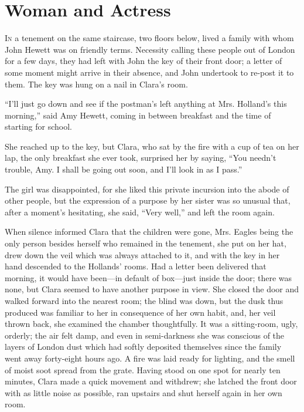 \chapter{Woman and Actress}

\textsc{In} a tenement on the same staircase, two floors below, lived a
family with whom John Hewett was on friendly terms. Necessity calling
these people out of London for a few days, they had left with John the
key of their front door; a letter of some moment might arrive in their
absence, and John undertook to re-post it to them. The key was hung on a
nail in Clara's room.

``I'll just go down and see if the postman's left anything at Mrs.
Holland's this morning,'' said Amy Hewett, coming in between breakfast
and the time of starting for school.

She reached up to the key, but Clara, who sat by the fire with a cup of
tea on her lap, the only breakfast she ever took, surprised her by
saying, ``You needn't trouble, Amy. I shall be going out soon, and I'll
look in as I pass.''

{}The girl was disappointed, for she liked this private incursion into
the abode of other people, but the expression of a purpose by her sister
was so unusual that, after a moment's hesitating, she said, ``Very
well,'' and left the room again.

When silence informed Clara that the children were gone, Mrs. Eagles
being the only person besides herself who remained in the tenement, she
put on her hat, drew down the veil which was always attached to it, and
with the key in her hand descended to the Hollands' rooms. Had a letter
been delivered that morning, it would have been---in default of
box---just inside the door; there was none, but Clara seemed to have
another purpose in view. She closed the door and walked forward into the
nearest room; the blind was down, but the dusk thus produced was
familiar to her in consequence of her own habit, and, her veil thrown
back, she examined the chamber thoughtfully. It was a sitting-room,
ugly, orderly; the air felt damp, and even in semi-darkness she was
conscious of the layers of London dust which had softly deposited
themselves since the family went away forty-eight hours ago. A {}fire
was laid ready for lighting, and the smell of moist soot spread from the
grate. Having stood on one spot for nearly ten minutes, Clara made a
quick movement and withdrew; she latched the front door with as little
noise as possible, ran upstairs and shut herself again in her own room.


